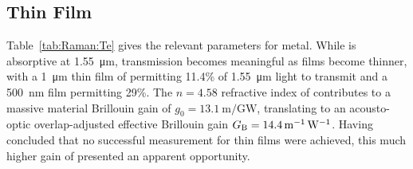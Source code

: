 \subsection{\texorpdfstring{}{Te} Thin Film}
\label{subsec:Raman:Target:Te}

Table~\ref{tab:Raman:Te} gives the relevant parameters for  metal. While  is absorptive at \SI{1.55}{\micro\meter}, transmission becomes meaningful as films become thinner, with a \SI{1}{\micro\meter} thin film of  permitting 11.4\% of \SI{1.55}{\micro\meter} light to transmit and a \SI{500}{\nano\meter} film permitting 29\%. \cite{ciesielski2018permittivity} The \(n = 4.58\) refractive index of  contributes to a massive material Brillouin gain of \(g_{0} = \SI{13.1}{\meter\per\giga\watt}\), translating to an acousto-optic overlap-adjusted effective Brillouin gain \(G_{\rm B} = \SI{14.4}{\per\meter\per\watt}\). Having concluded that no successful measurement for  thin films were achieved, this much higher gain of  presented an apparent opportunity.

